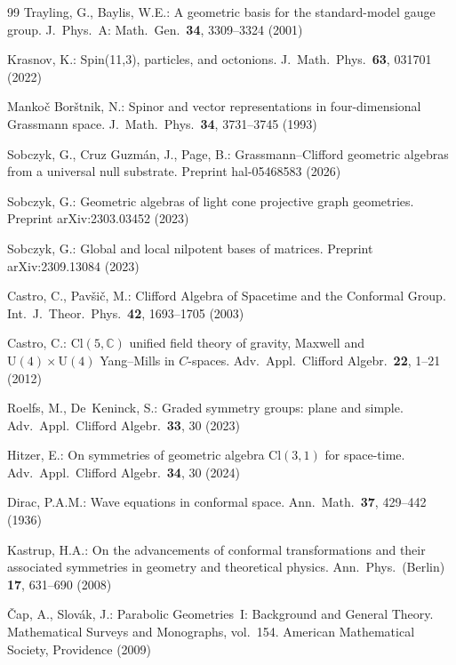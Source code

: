 \documentclass{birkjour}
\theoremstyle{definition}
\theoremstyle{remark}
\numberwithin{equation}{section}
\newcommand{\Cl}{\mathrm{Cl}}
\newcommand{\C}{\mathbb{C}}
\begin{document}
\begin{thebibliography}{99}
Trayling, G., Baylis, W.E.:
A geometric basis for the standard-model gauge group.
J.\ Phys.\ A: Math.\ Gen.\ \textbf{34}, 3309--3324 (2001)

Krasnov, K.:
Spin(11,3), particles, and octonions.
J.\ Math.\ Phys.\ \textbf{63}, 031701 (2022)

Manko\v{c} Bor\v{s}tnik, N.:
Spinor and vector representations in four-dimensional
Grassmann space.
J.\ Math.\ Phys.\ \textbf{34}, 3731--3745 (1993)

Sobczyk, G., Cruz Guzm\'an, J., Page, B.:
Grassmann--Clifford geometric algebras from a universal
null substrate.
Preprint hal-05468583 (2026)

Sobczyk, G.:
Geometric algebras of light cone projective graph
geometries.
Preprint arXiv:2303.03452 (2023)

Sobczyk, G.:
Global and local nilpotent bases of matrices.
Preprint arXiv:2309.13084 (2023)

Castro, C., Pav\v{s}i\v{c}, M.:
Clifford Algebra of Spacetime and the Conformal Group.
Int.\ J.\ Theor.\ Phys.\ \textbf{42}, 1693--1705 (2003)

Castro, C.:
$\Cl(5,\C)$ unified field theory of gravity, Maxwell and
$\mathrm{U}(4)\times\mathrm{U}(4)$ Yang--Mills in $C$-spaces.
Adv.\ Appl.\ Clifford Algebr.\ \textbf{22}, 1--21 (2012)

Roelfs, M., De~Keninck, S.:
Graded symmetry groups: plane and simple.
Adv.\ Appl.\ Clifford Algebr.\ \textbf{33}, 30 (2023)

Hitzer, E.:
On symmetries of geometric algebra $\Cl(3,1)$ for space-time.
Adv.\ Appl.\ Clifford Algebr.\ \textbf{34}, 30 (2024)

Dirac, P.A.M.:
Wave equations in conformal space.
Ann.\ Math.\ \textbf{37}, 429--442 (1936)

Kastrup, H.A.:
On the advancements of conformal transformations and their
associated symmetries in geometry and theoretical physics.
Ann.\ Phys.\ (Berlin) \textbf{17}, 631--690 (2008)

\v{C}ap, A., Slov\'ak, J.:
Parabolic Geometries~I: Background and General Theory.
Mathematical Surveys and Monographs, vol.~154.
American Mathematical Society, Providence (2009)


\end{thebibliography}
\end{document}
